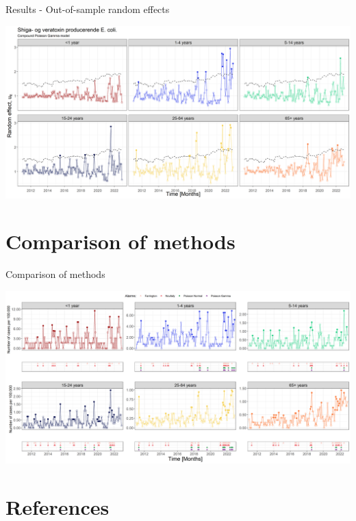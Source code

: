 \documentclass[aspectratio=169]{beamer}
\begin{document}
\begin{frame}{Results - Out-of-sample random effects}
\protect\hypertarget{results---out-of-sample-random-effects-1}{}
\tiny

\includegraphics[width=1\linewidth]{../figures/windowedSTECPoisGExclude}

\normalsize
\end{frame}

\hypertarget{comparison-of-methods}{%
\section{Comparison of methods}\label{comparison-of-methods}}

\begin{frame}{Comparison of methods}
\tiny

\includegraphics[width=1\linewidth]{../figures/compareMethodsDeluxe}

\normalsize
\end{frame}

\hypertarget{references}{%
\section{References}\label{references}}
\end{document}
